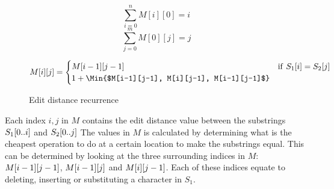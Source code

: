 \begin{figure}[t]
    \begin{center}
	$$
		\sum^{n}_{i = 0}{M[i][0] = i}
	$$
	$$
		\sum^{m}_{j = 0}{M[0][j] = j}
	$$

	\begin{gather*}
		M[i][j] =
		\begin{cases}
			M[i-1][j-1] & \mathrm{if\ } S_1[i] = S_2[j] \\
            1 + \Min{$M[i-1][j-1], M[i][j-1], M[i-1][j-1]$}
		\end{cases}
	\end{gather*}
	\caption{Edit distance recurrence}
	\label{eq:editdistancerecurrence}
    \end{center}
\end{figure}

Each index $i, j$ in $M$ contains the edit distance value between the substrings
$S_1[{0..i}]$ and $S_2[{0..j}]$ The values in $M$ is calculated by
determining what is the cheapest operation to do at a certain location to make the
substrings equal. This can be determined by looking at the three surrounding indices in
$M$: $M[{i - 1}][{j - 1}]$, $M[{i - 1}][{j}]$ and
$M[{i}][{j - 1}]$. Each of these indices equate to deleting, inserting or
substituting a character in $S_1$. 

